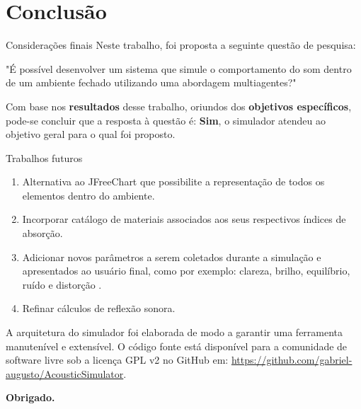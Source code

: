 \section{Conclusão}

\begin{frame}{Considerações finais}
Neste trabalho, foi proposta a seguinte questão de pesquisa: 
\linebreak
\linebreak
\begin{center}
"É possível desenvolver um sistema que simule o comportamento do som dentro de um ambiente fechado utilizando uma abordagem multiagentes?" 
\linebreak
\linebreak
\end{center}
Com base nos \textbf{resultados} desse trabalho, oriundos dos \textbf{objetivos específicos}, pode-se concluir que a resposta à questão é: \textbf{Sim}, o simulador atendeu ao objetivo geral para o qual foi proposto.
\end{frame}

\begin{frame}[allowframebreaks]{Trabalhos futuros}
\begin{enumerate}
\item Alternativa ao JFreeChart que possibilite a representação de todos os elementos dentro do ambiente.
\linebreak
\item Incorporar catálogo de materiais associados aos seus respectivos índices de absorção.
\linebreak
\item Adicionar novos parâmetros a serem coletados durante a simulação e apresentados ao usuário final, como por exemplo: clareza, brilho, equilíbrio, ruído e distorção \cite{figueiredo}.
\linebreak
\item Refinar cálculos de reflexão sonora.
\linebreak
\linebreak
\end{enumerate}

A arquitetura do simulador foi elaborada de modo a garantir uma ferramenta manutenível e extensível. O código fonte está disponível para a comunidade de software livre sob a licença GPL v2 no GitHub em: \url{https://github.com/gabriel-augusto/AcousticSimulator}.

\end{frame}

\begin{frame}
\begin{center}
\textbf{{\Huge Obrigado.}}
\end{center}
\end{frame}